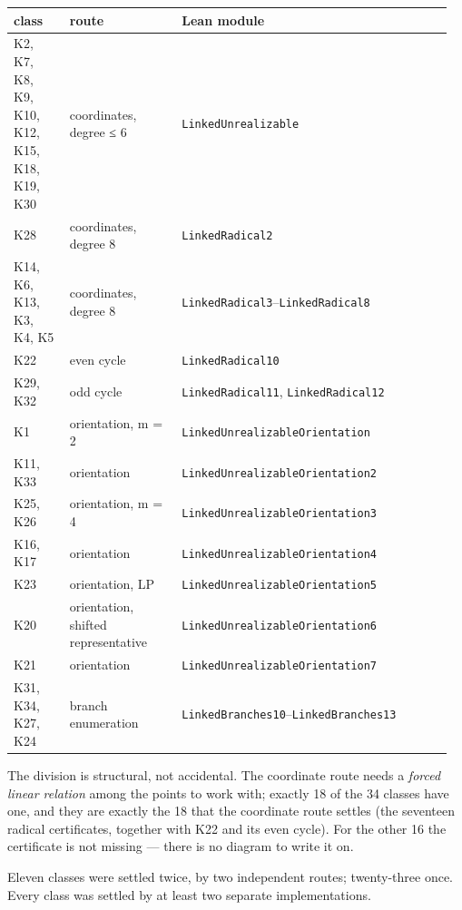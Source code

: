 \documentclass[11pt,a4paper]{article}
\theoremstyle{named}
\begin{document}
\begin{center}\begin{small}
\begin{tabular}{>{\raggedright\arraybackslash}p{0.126\linewidth}>{\raggedright\arraybackslash}p{0.248\linewidth}>{\raggedright\arraybackslash}p{0.584\linewidth}}
\hline
class & route & Lean module \\
\hline
K2, K7, K8, K9, K10, K12, K15, K18, K19, K30 & coordinates, degree ≤ 6 & \texttt{LinkedUnrealizable} \\
K28 & coordinates, degree 8 & \texttt{LinkedRadical2} \\
K14, K6, K13, K3, K4, K5 & coordinates, degree 8 & \texttt{LinkedRadical3}–\texttt{LinkedRadical8} \\
K22 & even cycle & \texttt{LinkedRadical10} \\
K29, K32 & odd cycle & \texttt{LinkedRadical11}, \texttt{LinkedRadical12} \\
K1 & orientation, m = 2 & \texttt{LinkedUnrealizableOrientation} \\
K11, K33 & orientation & \texttt{LinkedUnrealizableOrientation2} \\
K25, K26 & orientation, m = 4 & \texttt{LinkedUnrealizableOrientation3} \\
K16, K17 & orientation & \texttt{LinkedUnrealizableOrientation4} \\
K23 & orientation, LP & \texttt{LinkedUnrealizableOrientation5} \\
K20 & orientation, shifted representative & \texttt{LinkedUnrealizableOrientation6} \\
K21 & orientation & \texttt{LinkedUnrealizableOrientation7} \\
K31, K34, K27, K24 & branch enumeration & \texttt{LinkedBranches10}–\texttt{LinkedBranches13} \\
\hline
\end{tabular}
\end{small}\end{center}

The division is structural, not accidental. The coordinate route needs a \textit{forced linear relation} among the points to work with; exactly 18 of the 34 classes have one, and they are exactly the 18 that the coordinate route settles (the seventeen radical certificates, together with K22 and its even cycle). For the other 16 the certificate is not missing — there is no diagram to write it on.

Eleven classes were settled twice, by two independent routes; twenty-three once. Every class was settled by at least two separate implementations.
\end{document}
